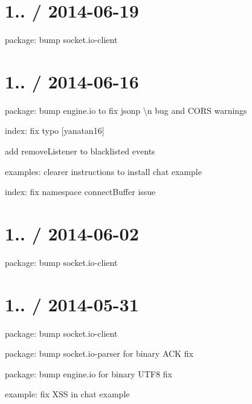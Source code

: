 \section*{1.. / 2014-\/06-\/19 }


\begin{DoxyItemize}
\item package\+: bump {\ttfamily socket.\+io-\/client}
\end{DoxyItemize}

\section*{1.. / 2014-\/06-\/16 }


\begin{DoxyItemize}
\item package\+: bump {\ttfamily engine.\+io} to fix jsonp {\ttfamily \textbackslash{}n} bug and C\+O\+RS warnings
\item index\+: fix typo \mbox{[}yanatan16\mbox{]}
\item add {\ttfamily remove\+Listener} to blacklisted events
\item examples\+: clearer instructions to install chat example
\item index\+: fix namespace {\ttfamily connect\+Buffer} issue
\end{DoxyItemize}

\section*{1.. / 2014-\/06-\/02 }


\begin{DoxyItemize}
\item package\+: bump socket.\+io-\/client
\end{DoxyItemize}

\section*{1.. / 2014-\/05-\/31 }


\begin{DoxyItemize}
\item package\+: bump {\ttfamily socket.\+io-\/client}
\item package\+: bump {\ttfamily socket.\+io-\/parser} for binary A\+CK fix
\item package\+: bump {\ttfamily engine.\+io} for binary U\+T\+F8 fix
\item example\+: fix X\+SS in chat example
\end{DoxyItemize}

